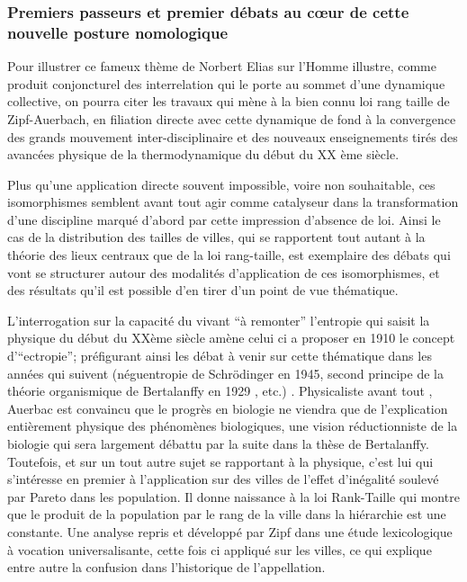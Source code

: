 \subsubsection{Premiers passeurs et premier débats au cœur de cette nouvelle posture nomologique}

Pour illustrer ce fameux thème de Norbert Elias \autocite[31-33]{Delmotte2010} \textcite{Elias1991} sur l'Homme illustre, comme produit conjoncturel des interrelation qui le porte au sommet d'une dynamique collective, on pourra citer les travaux qui mène à la bien connu loi rang taille de Zipf-Auerbach, en filiation directe avec cette dynamique de fond à la convergence des grands mouvement inter-disciplinaire et des nouveaux enseignements tirés des avancées physique de la thermodynamique du début du XX ème siècle.

Plus qu'une application directe souvent impossible, voire non souhaitable, ces isomorphismes semblent avant tout agir comme catalyseur dans la transformation d'une discipline marqué d'abord par cette impression d'absence de loi. Ainsi le cas de la distribution des tailles de villes, qui se rapportent tout autant à la théorie des lieux centraux que de la loi rang-taille, est exemplaire des débats qui vont se structurer autour des modalités d'application de ces isomorphismes, et des résultats qu'il est possible d'en tirer d'un point de vue thématique. 

L'interrogation sur la capacité du vivant \enquote{à remonter} l'entropie qui saisit la physique du début du XXème siècle amène celui ci a proposer en 1910 le concept d'\enquote{ectropie}; préfigurant ainsi les débat à venir sur cette thématique dans les années qui suivent (néguentropie de Schrödinger en 1945, second principe de la théorie organismique de Bertalanffy en 1929 \autocite[475]{Pouvreau2013}, etc.) \autocite[80]{Pouvreau2013}. Physicaliste avant tout \autocite[87]{Pouvreau2013}, Auerbac est convaincu que le progrès en biologie ne viendra que de l'explication entièrement physique des phénomènes biologiques, une vision réductionniste de la biologie qui sera largement débattu par la suite dans la thèse de Bertalanffy. Toutefois, et sur un tout autre sujet se rapportant à la physique, c'est lui qui s’intéresse en premier à l'application sur des villes de l'effet d'inégalité soulevé par Pareto dans les population.\autocite[94]{Rosser2011} Il donne naissance à la loi Rank-Taille qui montre que le produit de la population par le rang de la ville dans la hiérarchie est une constante. Une analyse repris et développé par Zipf dans une étude lexicologique à vocation universalisante, cette fois ci appliqué sur les villes, ce qui explique entre autre la confusion dans l’historique de l’appellation.

